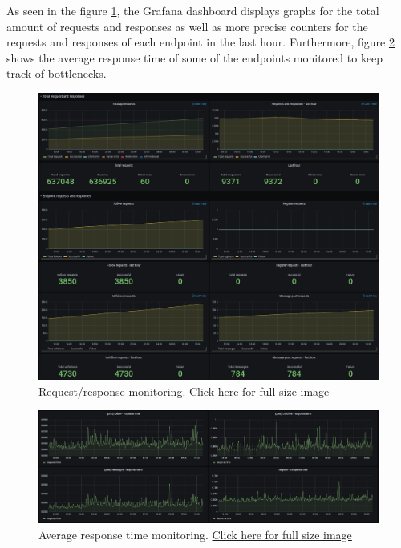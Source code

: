 As seen in the figure \ref{fig:Monitoring1}, the Grafana dashboard displays graphs for the total amount of requests and responses as well as more precise counters for the requests and responses of each endpoint in the last hour. Furthermore, figure \ref{fig:Monitoring2} shows the average response time of some of the endpoints monitored to keep track of bottlenecks.

\begin{figure}[H]
    \centering
    \includegraphics[width=1\textwidth]{report/images/MonitoringRequest.png}
    \caption{Request/response monitoring. \href{https://github.com/Niels-Frederik/MiniTwit/blob/main/report/images/MonitoringRequest.png}{Click here for full size image}}
    \label{fig:Monitoring1}
\end{figure}

\begin{figure}[H]
    \centering
    \includegraphics[width=1\textwidth]{report/images/grafana-response-times.png}
    \caption{Average response time monitoring. \href{https://github.com/Niels-Frederik/MiniTwit/blob/main/report/images/grafana-response-times.png}{Click here for full size image}}
    \label{fig:Monitoring2}
\end{figure}


